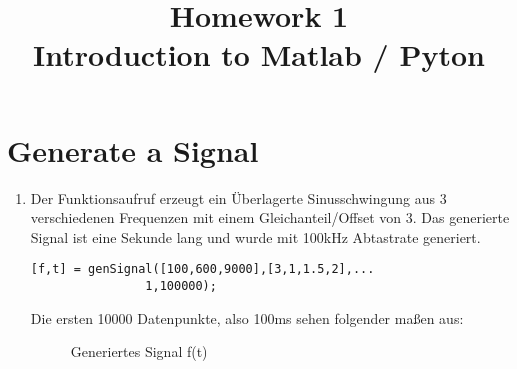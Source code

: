 \documentclass[conference]{IEEEtran}
\begin{document}
%
%
\title{Homework 1\\ Introduction to Matlab / Pyton}

\author{
}


\maketitle

\IEEEpeerreviewmaketitle

\section{Generate a Signal}

\begin{enumerate}
\item Der Funktionsaufruf erzeugt ein Überlagerte Sinusschwingung aus 3 verschiedenen Frequenzen mit einem Gleichanteil/Offset von 3. Das generierte Signal ist eine Sekunde lang und wurde mit 100kHz Abtastrate generiert.

\begin{lstlisting}
[f,t] = genSignal([100,600,9000],[3,1,1.5,2],...
				1,100000);
\end{lstlisting}
Die ersten 10000 Datenpunkte, also 100ms sehen folgender maßen aus:
\begin{figure}[h!]
  	\centering
    \scalebox{.5}{}
    \caption{Generiertes Signal f(t)}
    \label{fig:sig}
\end{figure}
\end{enumerate}
\end{document}

